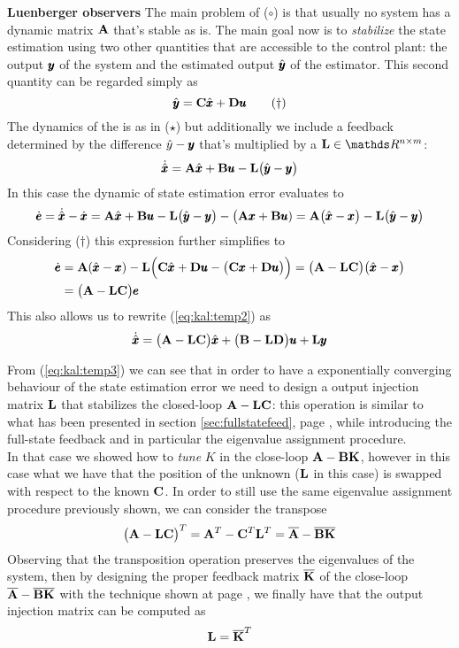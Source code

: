 	\textbf{Luenberger observers} The main problem of ($\circ$) is that usually no system has a dynamic matrix $\mathbf{A}$ that's stable as is. The main goal now is to \textit{stabilize} the state estimation using two other quantities that are accessible to the control plant: the output $\pmb{y}$ of the system and the estimated output $\hat {\pmb{y}}$ of the estimator. This second quantity can be regarded simply as
	\[ \hat {\pmb{y}} = \mathbf{C} \hat {\pmb{x}} + \mathbf{D} \pmb{u} \tag{$\dagger$} \]
	The dynamics of the  is as in ($\star$) but additionally we include a feedback determined by the difference $\hat y- \pmb{y}$ that's multiplied by a  $\mat L \in \mathds R^{n\times m}$:
	\begin{equation} \label{eq:kal:temp2}
		\dot{\hat {\pmb{x}}} = \mathbf{A} \hat {\pmb{x}} + \mathbf{B} \pmb{u} - \mathbf{L} \big(\hat {\pmb{y}} - \pmb{y}\big)
	\end{equation}
	In this case the dynamic of state estimation error evaluates to
	\[ \dot{\pmb{e}} = \dot{\hat {\pmb{x}}} - \dot{\pmb{x}} = \mathbf{A} \hat {\pmb{x}} + \mathbf{B} \pmb{u} - \mathbf{L} \big(\hat {\pmb{y}} - \pmb{y}\big) - \big(\mathbf{A} \pmb{x} +\mathbf{B} \pmb{u}) = \mathbf{A}\big(\hat {\pmb{x}} - \pmb{x} \big) - \mathbf{L} \big(\hat {\pmb{y}} - \pmb{y}\big) \]
	Considering ($\dagger$) this expression further simplifies to
	\begin{equation} \label{eq:kal:temp3}
	\begin{split}
		\dot{\pmb{e}} & = \mathbf{A}(\hat {\pmb{x}} - \pmb{x}) - \mathbf{L}\Big( \mathbf{C} \hat {\pmb{x}} + \mathbf{D} \pmb{u} - \big( \mathbf{C}\pmb{x} + \mathbf{D}\pmb{u} \big) \Big) = \big(\mathbf{A}- \mathbf{L} \mathbf{C}\big) \big(\hat {\pmb{x}} - \pmb{x}\big)\\
		& = \big(\mathbf{A}- \mathbf{L} \mathbf{C}\big)\pmb{e}
	\end{split}
	\end{equation}
	This also allows us to rewrite (\ref{eq:kal:temp2}) as
	\begin{equation}
		\dot{\hat {\pmb{x}}} = \big(\mathbf{A}-\mathbf{L}\mathbf{C}\big)\hat {\pmb{x}} + \big(\mathbf{B}-\mathbf{L} \mathbf{D}\big) \pmb{u} + \mathbf{L} \pmb{y}
	\end{equation}
	
	From (\ref{eq:kal:temp3}) we can see that in order to have a exponentially converging behaviour of the state estimation error we need to design a output injection matrix $\mathbf{L}$ that stabilizes the closed-loop $\mathbf{A} - \mathbf{L} \mathbf{C}$: this operation is similar to what has been presented in section \ref{sec:fullstatefeed}, page \pageref{sec:fullstatefeed}, while introducing the full-state feedback and in particular the eigenvalue assignment procedure.\\
	In that case we showed how to \textit{tune} $K$ in the close-loop $\mathbf{A}-\mathbf{B}\mathbf{K}$, however in this case what we have that the position of the unknown ($\mathbf{L}$ in this case) is swapped with respect to the known $\mathbf{C}$. In order to still use the same eigenvalue assignment procedure previously shown, we can consider the transpose
	\[ \big(\mathbf{A}-\mathbf{L}\mathbf{C}\big)^T = \mathbf{A}^T - \mathbf{C}^T\mathbf{L}^T = \overline {\mathbf{A}} - \overline {\mathbf{B}\mathbf{K}}\]
	Observing that the transposition operation preserves the eigenvalues of the system, then by designing the proper feedback matrix $\overline {\mathbf{K}}$ of the close-loop $\overline {\mathbf{A}} - \overline {\mathbf{B}\mathbf{K}}$ with the technique shown at page \pageref{sec:fullstatefeed}, we finally have that the output injection matrix can be computed as
	\[ \mathbf{L} = \overline {\mathbf{K}}^T \]
	
